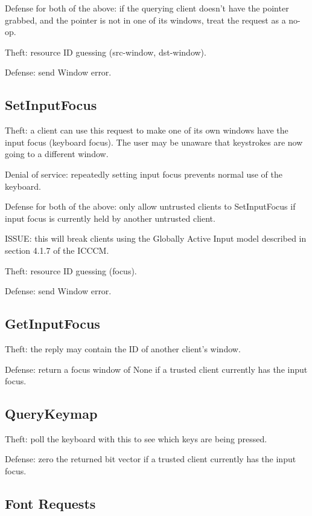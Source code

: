 Defense for both of the above: if the querying client doesn't have the
pointer grabbed, and the pointer is not in one of its windows, treat
the request as a no-op.

Theft: resource ID guessing (src-window, dst-window).

Defense: send Window error.



\subsection{SetInputFocus}

Theft: a client can use this request to make one of its own windows
have the input focus (keyboard focus).  The user may be unaware that
keystrokes are now going to a different window.

Denial of service: repeatedly setting input focus prevents normal use
of the keyboard.

Defense for both of the above: only allow untrusted clients to
SetInputFocus if input focus is currently held by another untrusted
client.

ISSUE: this will break clients using the Globally Active Input model
described in section 4.1.7 of the ICCCM.

Theft: resource ID guessing (focus).

Defense: send Window error.



\subsection{GetInputFocus}

Theft: the reply may contain the ID of another client's window.

Defense: return a focus window of None if a trusted client currently
has the input focus.



\subsection{QueryKeymap}

Theft: poll the keyboard with this to see which keys are being pressed.

Defense: zero the returned bit vector if a trusted client currently
has the input focus.



\subsection{Font Requests}

